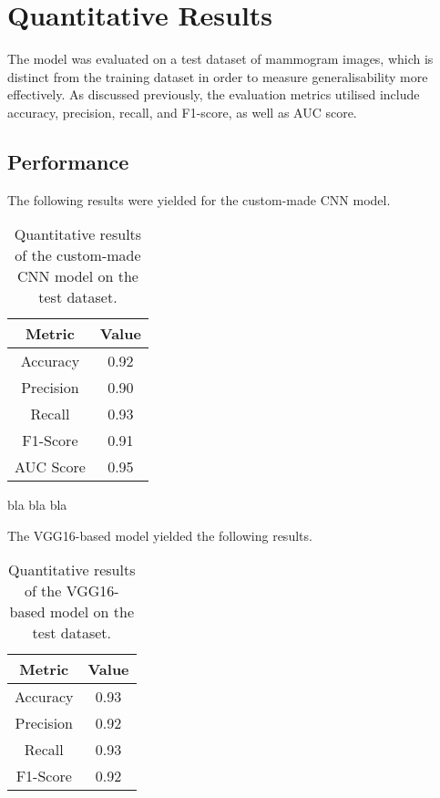 \documentclass[../main]{subfiles}
\begin{document}
\section{Quantitative Results}
\label{sec:quantitative-results}
The model was evaluated on a test dataset of mammogram images, which is distinct from the training dataset in order to measure generalisability more effectively. As discussed previously, the evaluation metrics utilised include accuracy, precision, recall, and F1-score, as well as AUC score.

\subsection{Performance}
The following results were yielded for the custom-made CNN model.

\begin{table}[h]
    \centering
    \begin{tabular}{|c|c|}
        \hline
        \textbf{Metric} & \textbf{Value} \\
        \hline
        Accuracy & 0.92 \\
        Precision & 0.90 \\
        Recall & 0.93 \\
        F1-Score & 0.91 \\
        AUC Score & 0.95 \\
        \hline
    \end{tabular}
    \caption{Quantitative results of the custom-made CNN model on the test dataset.}
    \label{tab:quantitative-results}
\end{table}

bla bla bla

The VGG16-based model yielded the following results.

\begin{table}[h]
    \centering
    \begin{tabular}{|c|c|}
        \hline
        \textbf{Metric} & \textbf{Value} \\
        \hline
        Accuracy & 0.93 \\
        Precision & 0.92 \\
        Recall & 0.93 \\
        F1-Score & 0.92 \\
        \hline
    \end{tabular}
    \caption{Quantitative results of the VGG16-based model on the test dataset.}
    \label{tab:quantitative-results}
\end{table}
\end{document}
